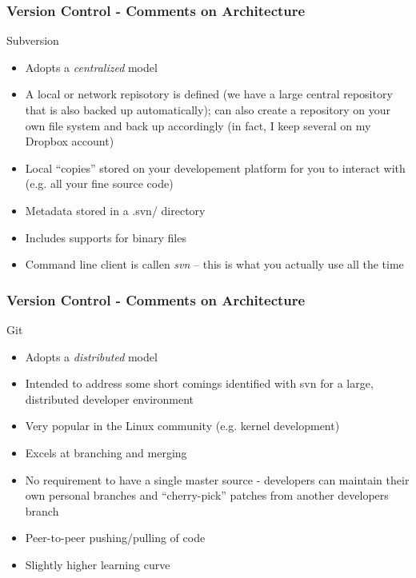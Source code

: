 \documentclass[mathserif]{beamer}
\begin{document}
\begin{frame}
\frametitle{Version Control - Comments on Architecture}

\begin{block}{Subversion}
\begin{itemize}
\item Adopts a {\em centralized} model 
\item A local or network repisotory is defined (we have a large
  central repository that is also backed up automatically); can also
  create a repository on your own file system and back up accordingly
  (in fact, I keep several on my Dropbox account)
\item Local ``copies'' stored on your developement platform for you to
  interact with (e.g. all your fine source code)
\item Metadata stored in a .svn/ directory
\item Includes supports for binary files
\item Command line client is callen {\em svn} -- this is what you
  actually use all the time
\end{itemize}
\end{block}
\end{frame}

\begin{frame}
\frametitle{Version Control - Comments on Architecture}
\begin{block}{Git}
\begin{itemize}
\item Adopts a {\em distributed} model
\item Intended to address some short comings identified with svn for a
  large, distributed developer environment
\item Very popular in the Linux community (e.g. kernel development)
\item Excels at branching and merging
\item No requirement to have a single master source - developers can
  maintain their own personal branches and ``cherry-pick'' patches
  from another developers branch
\item Peer-to-peer pushing/pulling of code
\item Slightly higher learning curve
\end{itemize}
\end{block}
\end{frame}
\end{document}
